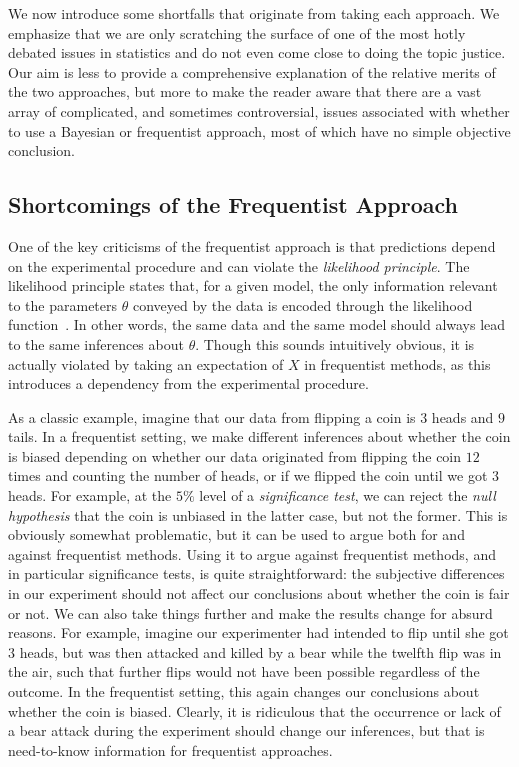 We now introduce some shortfalls that originate from taking each approach.  We emphasize that we are only
scratching the surface of one of the most hotly debated issues in statistics and do not even come close to doing
the topic justice.  Our aim is less to provide a comprehensive explanation of the relative merits of the two approaches, but
more to make the reader aware that there are a vast array of complicated, and sometimes controversial,
issues associated with whether to use a Bayesian or
frequentist approach, most of which have no simple objective conclusion.


\subsection{Shortcomings of the Frequentist Approach}
\label{sec:bayes:religion:freq}

One of the key criticisms of the frequentist approach is that predictions depend on the experimental procedure and
can violate the \emph{likelihood principle}.  The likelihood principle states that, for a given model, 
the only information relevant
to the parameters $\theta$ conveyed by the data is encoded through the likelihood function~\citep{robert2007bayesian}.  
In other words, the same data and 
the same model should always lead to the same inferences about $\theta$.  Though this sounds intuitively obvious, it is actually violated by
taking an expectation of $X$ in frequentist methods, as this introduces a dependency from the experimental procedure.

As a classic example, 
imagine that our data from flipping a coin is $3$ heads and $9$ tails.
In a frequentist setting, we make different inferences about whether the coin is biased 
depending on whether our data originated from flipping the coin $12$ times and counting the number of heads, or if we 
flipped the coin until we got $3$ heads.  For example, at the $5\%$ level of a \emph{significance test}, we can reject the \emph{null
hypothesis} that the coin is unbiased in the latter case, but not the former.  This is obviously somewhat problematic, but it
can be used to argue both for and against frequentist methods.  Using it
to argue against frequentist methods, and in particular significance tests, is quite straightforward: the subjective
differences in our experiment should not affect our conclusions about whether the coin is fair or not.  We can also take things
further and make the results change for absurd reasons.  For example, imagine our experimenter had intended to flip until she got
$3$ heads, but was then attacked and killed by a bear while the twelfth flip was in the air, such that further flips would not
have been possible regardless of the outcome.  In the frequentist setting, this again changes our conclusions
about whether the coin is biased.  Clearly, it is ridiculous that the occurrence or lack of a bear attack during the experiment
should change our inferences, but that is need-to-know information for frequentist approaches.

